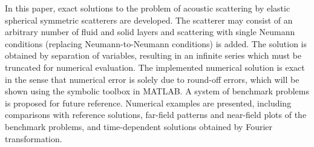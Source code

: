 In this paper, exact solutions to the problem of acoustic scattering by elastic spherical symmetric scatterers are developed. The scatterer may consist of an arbitrary number of fluid and solid layers and scattering with single Neumann conditions (replacing Neumann-to-Neumann conditions) is added. The solution is obtained by separation of variables, resulting in an infinite series which must be truncated for numerical evaluation. The implemented numerical solution is exact in the sense that numerical error is solely due to round-off errors, which will be shown using the symbolic toolbox in MATLAB. A system of benchmark problems is proposed for future reference. Numerical examples are presented, including comparisons with reference solutions, far-field patterns and near-field plots of the benchmark problems, and time-dependent solutions obtained by Fourier transformation.